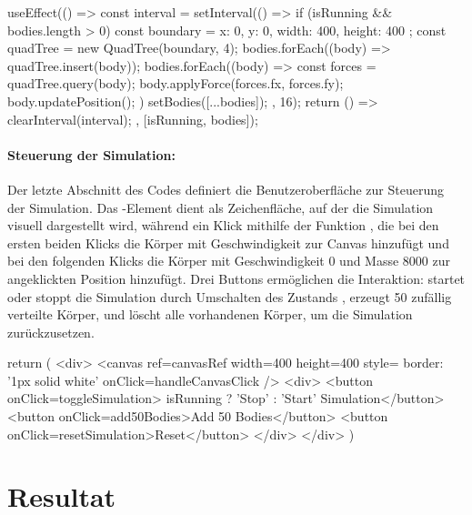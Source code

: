 \documentclass[a4paper,12pt,twoside]{article}
\begin{document}
\begin{javascript}
useEffect(() => {
    const interval = setInterval(() => {
        if (isRunning && bodies.length > 0) {
            const boundary = { x: 0, y: 0, width: 400, height: 400 };
            const quadTree = new QuadTree(boundary, 4);
            bodies.forEach((body) => quadTree.insert(body));
            bodies.forEach((body) => {
                const forces = quadTree.query(body);
                body.applyForce(forces.fx, forces.fy);
                body.updatePosition();
            })
            setBodies([...bodies]);
        }
    }, 16);
    return () => clearInterval(interval);
}, [isRunning, bodies]);
\end{javascript}


\paragraph{Steuerung der Simulation:}
Der letzte Abschnitt des Codes definiert die Benutzeroberfläche zur Steuerung der Simulation. Das -Element dient als Zeichenfläche, auf der die Simulation visuell dargestellt wird, 
während ein Klick mithilfe der Funktion , die bei den ersten beiden Klicks die Körper mit Geschwindigkeit zur Canvas hinzufügt und bei den folgenden Klicks die Körper mit Geschwindigkeit 0 und Masse 8000 zur angeklickten Position hinzufügt.
Drei Buttons ermöglichen die Interaktion: startet oder stoppt die Simulation durch Umschalten des Zustands ,  erzeugt 50 zufällig verteilte Körper, 
und  löscht alle vorhandenen Körper, um die Simulation zurückzusetzen.


\begin{javascript}
    return (
        <div>
            <canvas ref={canvasRef} width={400} height={400} style={{ border: '1px solid white' }} onClick={handleCanvasClick} />
            <div>
                <button onClick={toggleSimulation}> {isRunning ? 'Stop' : 'Start'} Simulation</button>
                <button onClick={add50Bodies}>Add 50 Bodies</button>
                <button onClick={resetSimulation}>Reset</button>
            </div>
        </div>
    )
\end{javascript}


\section{Resultat}
\end{document}
